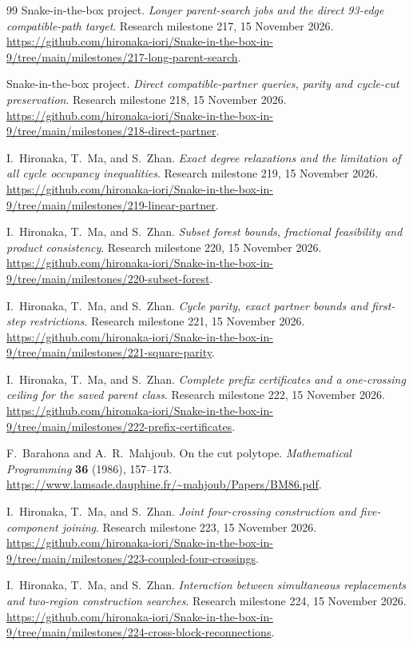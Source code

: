 \documentclass[11pt,a4paper]{article}
\theoremstyle{definition}
\theoremstyle{remark}
\begin{document}
\begin{thebibliography}{99}
Snake-in-the-box project. \emph{Longer parent-search jobs and the direct
93-edge compatible-path target}. Research milestone 217, 15 November 2026.
\url{https://github.com/hironaka-iori/Snake-in-the-box-in-9/tree/main/milestones/217-long-parent-search}.


Snake-in-the-box project. \emph{Direct compatible-partner queries, parity
and cycle-cut preservation}. Research milestone 218, 15 November 2026.
\url{https://github.com/hironaka-iori/Snake-in-the-box-in-9/tree/main/milestones/218-direct-partner}.


I.~Hironaka, T.~Ma, and S.~Zhan. \emph{Exact degree relaxations and
the limitation of all cycle occupancy inequalities}. Research milestone
219, 15 November 2026.
\url{https://github.com/hironaka-iori/Snake-in-the-box-in-9/tree/main/milestones/219-linear-partner}.


I.~Hironaka, T.~Ma, and S.~Zhan. \emph{Subset forest bounds,
fractional feasibility and product consistency}. Research milestone 220,
15 November 2026.
\url{https://github.com/hironaka-iori/Snake-in-the-box-in-9/tree/main/milestones/220-subset-forest}.

I.~Hironaka, T.~Ma, and S.~Zhan. \emph{Cycle parity, exact partner bounds
and first-step restrictions}. Research milestone 221, 15 November 2026.
\url{https://github.com/hironaka-iori/Snake-in-the-box-in-9/tree/main/milestones/221-square-parity}.

I.~Hironaka, T.~Ma, and S.~Zhan. \emph{Complete prefix certificates
and a one-crossing ceiling for the saved parent class}.
Research milestone 222, 15 November 2026.
\url{https://github.com/hironaka-iori/Snake-in-the-box-in-9/tree/main/milestones/222-prefix-certificates}.

F.~Barahona and A.~R.~Mahjoub. On the cut polytope.
\emph{Mathematical Programming} \textbf{36} (1986), 157--173.
\url{https://www.lamsade.dauphine.fr/~mahjoub/Papers/BM86.pdf}.

I.~Hironaka, T.~Ma, and S.~Zhan. \emph{Joint four-crossing construction
and five-component joining}. Research milestone 223, 15 November 2026.
\url{https://github.com/hironaka-iori/Snake-in-the-box-in-9/tree/main/milestones/223-coupled-four-crossings}.

I.~Hironaka, T.~Ma, and S.~Zhan. \emph{Interaction between simultaneous
replacements and two-region construction searches}.
Research milestone 224, 15 November 2026.
\url{https://github.com/hironaka-iori/Snake-in-the-box-in-9/tree/main/milestones/224-cross-block-reconnections}.


\end{thebibliography}
\end{document}
